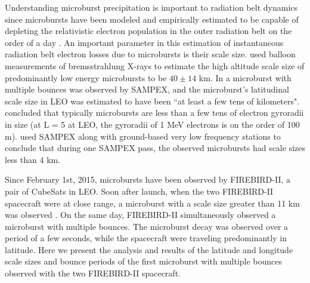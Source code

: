\documentclass[draft, linenumbers]{agujournal}
\begin{document}
Understanding microburst precipitation is important to radiation belt dynamics since microbursts have been modeled and empirically estimated to be capable of depleting the relativistic electron population in the outer radiation belt on the order of a day \citep{O'Brien2004, Thorne2005, Shprits2007, Breneman2017}. An important parameter in this estimation of instantaneous radiation belt electron losses due to microbursts is their scale size. \citet{Parks1967} used balloon measurements of bremsstrahlung X-rays to estimate the high altitude scale size of predominantly low energy microbursts to be $40 \pm 14$ km. In \citet{Blake1996} a microburst with multiple bounces was observed by SAMPEX, and the microburst's latitudinal scale size in LEO was estimated to have been ``at least a few tens of kilometers". \citet{Blake1996} concluded that typically microbursts are less than a few tens of electron gyroradii in size (at L = 5 at LEO, the gyroradii of 1 MeV electrons is on the order of 100 m). \citet{Dietrich2010} used SAMPEX along with ground-based very low frequency stations to conclude that during one SAMPEX pass, the observed microbursts had scale sizes less than $4$ km.

Since February 1st, 2015, microbursts have been observed by FIREBIRD-II, a pair of CubeSats in LEO. Soon after launch, when the two FIREBIRD-II spacecraft were at close range, a microburst with a scale size greater than 11 km was observed \citep{Crew2016}. On the same day, FIREBIRD-II simultaneously observed a microburst with multiple bounces. The microburst decay was observed over a period of a few seconds, while the spacecraft were traveling predominantly in latitude. Here we present the analysis and results of the latitude and longitude scale sizes and bounce periods of the first microburst with multiple bounces observed with the two FIREBIRD-II spacecraft.
\end{document}
